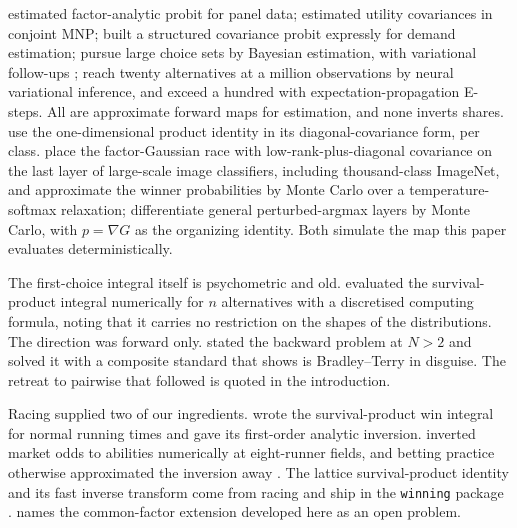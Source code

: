 \documentclass[12pt]{article}
\theoremstyle{remark}
\begin{document}
\citet{elrod1995}
estimated factor-analytic probit for panel data;
\citet{haaijer1998} estimated utility covariances in conjoint MNP;
\citet{cohen2010} built a structured covariance probit expressly for
demand estimation;
\citet{loaiza2022} pursue large choice sets by
Bayesian estimation, with variational follow-ups \citep{loaiza2023};
\citet{kim2026} reach twenty alternatives at a million observations by
neural variational inference, and \citet{ding2024} exceed a hundred with
expectation-propagation E-steps. All are approximate forward maps for
estimation, and none inverts shares. \citet{girolami2006} use the
one-dimensional product identity in its diagonal-covariance form,
per class. \citet{collier2021} place the factor-Gaussian race with
low-rank-plus-diagonal covariance on the last layer of large-scale image
classifiers, including thousand-class ImageNet, and approximate the
winner probabilities by Monte Carlo over a temperature-softmax
relaxation; \citet{berthet2020} differentiate general perturbed-argmax
layers by Monte Carlo, with $p = \nabla G$ as the organizing identity.
Both simulate the map this paper evaluates deterministically.

The first-choice integral itself is psychometric and old.
\citet{thurstone1945} evaluated the survival-product integral
numerically for $n$ alternatives with a discretised computing formula,
noting that it carries no restriction on the shapes of the
distributions. The direction was forward only. \citet{guilford1937}
stated the backward problem at $N > 2$ and solved it with a composite
standard that \citet{torgerson1958} shows is Bradley--Terry in
disguise. The retreat to pairwise that followed is quoted in the
introduction.

Racing supplied two of our ingredients. \citet{henery1981} wrote the
survival-product win integral for normal running times and gave its
first-order analytic inversion. \citet{ali1998} inverted market odds to
abilities numerically at eight-runner fields, and betting practice
otherwise approximated the inversion away \citep{lo1994}. The lattice survival-product identity and
its fast inverse transform come from racing \citep{cotton2021} and ship in
the \texttt{winning} package \citep{winningpkg}. \citet{cotton2021}
names the common-factor extension developed here as an open problem.
\end{document}
